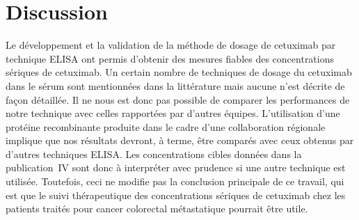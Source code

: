 \chapter{Discussion}
Le développement et la validation de la méthode de dosage de cetuximab par technique ELISA ont permis d'obtenir des mesures fiables des concentrations sériques de cetuximab. Un certain nombre de techniques de dosage du cetuximab dans le sérum sont mentionnées dans la littérature mais aucune n'est décrite de façon détaillée. Il ne nous est donc pas possible de comparer les performances de notre technique avec celles rapportées par d'autres équipes. L'utilisation d'une protéine recombinante produite dans le cadre d'une collaboration régionale implique que nos résultats devront, à terme, être comparés avec ceux obtenus par d'autres techniques ELISA. Les concentrations cibles données dans la publication~IV sont donc à interpréter avec prudence si une autre technique est utilisée. Toutefois, ceci ne modifie pas la conclusion principale de ce travail, qui est que le suivi thérapeutique des concentrations sériques de cetuximab chez les patients traités pour cancer colorectal métastatique pourrait être utile. 

